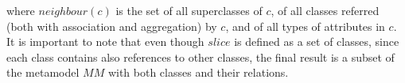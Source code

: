 \noindent where $neighbour(c)$ is the set of all superclasses of
$c$, of all classes referred (both with association and
aggregation) by $c$, and of all types of attributes in $c$. 
It is important to note that even though $slice$ is defined
as a set of classes, since each class contains also references
to other classes, the final result is a subset of the metamodel $MM$
with both classes and their relations.
%
\begin{figure}
  \centering
 \hspace{10mm}          

\end{figure}
